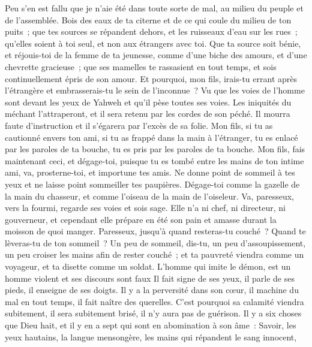 \begin{multicols}{2}
Peu s'en est fallu que je n'aie été dans toute sorte de mal, au milieu du peuple et de l'assemblée.
Bois des eaux de ta citerne et de ce qui coule du milieu de ton puits~;
que tes sources se répandent dehors, et les ruisseaux d'eau sur les rues~;
qu'elles soient à toi seul, et non aux étrangers avec toi.
Que ta source soit bénie, et réjouis-toi de la femme de ta jeunesse,
comme d'une biche des amours, et d'une chevrette gracieuse~; que ses mamelles te rassasient en tout temps, et sois continuellement épris de son amour.
Et pourquoi, mon fils, irais-tu errant après l'étrangère et embrasserais-tu le sein de l'inconnue~?
Vu que les voies de l'homme sont devant les yeux de Yahweh et qu'il pèse toutes ses voies.
Les iniquités du méchant l'attraperont, et il sera retenu par les cordes de son péché.
Il mourra faute d'instruction et il s'égarera par l'excès de sa folie.
\VerseOne{}Mon fils, si tu as cautionné envers ton ami, si tu as frappé dans la main à l'étranger,
tu es enlacé par les paroles de ta bouche, tu es pris par les paroles de ta bouche.
Mon fils, fais maintenant ceci, et dégage-toi, puisque tu es tombé entre les mains de ton intime ami, va, prosterne-toi, et importune tes amis.
Ne donne point de sommeil à tes yeux et ne laisse point sommeiller tes paupières.
Dégage-toi comme la gazelle de la main du chasseur, et comme l'oiseau de la main de l'oiseleur.
Va, paresseux, vers la fourmi, regarde ses voies et sois sage.
Elle n'a ni chef, ni directeur, ni gouverneur,
et cependant elle prépare en été son pain et amasse durant la moisson de quoi manger.
Paresseux, jusqu'à quand resteras-tu couché~? Quand te lèveras-tu de ton sommeil~?
Un peu de sommeil, dis-tu, un peu d'assoupissement, un peu croiser les mains afin de rester couché~;
et ta pauvreté viendra comme un voyageur, et ta disette comme un soldat.
L'homme qui imite le démon, est un homme violent et ses discours sont faux
Il fait signe de ses yeux, il parle de ses pieds, il enseigne de ses doigts.
Il y a la perversité dans son cœur, il machine du mal en tout temps, il fait naître des querelles.
C'est pourquoi sa calamité viendra subitement, il sera subitement brisé, il n'y aura pas de guérison.
Il y a six choses que Dieu hait, et il y en a sept qui sont en abomination à son âme~: 
Savoir, les yeux hautains, la langue mensongère, les mains qui répandent le sang innocent,

\end{multicols}
